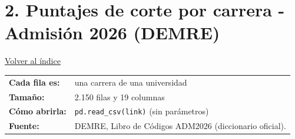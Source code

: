 \documentclass[10.5pt]{article}
\begin{document}
\section*{2. Puntajes de corte por carrera - Admisión 2026 (DEMRE)}
\vspace{-6pt}\hfill{\small\hyperlink{indice}{\textcolor{azuloscuro}{\underline{Volver al índice}}}}\par\vspace{2pt}
\begin{tabularx}{\linewidth}{@{}l X@{}}\textbf{Cada fila es:} & una carrera de una universidad \\\textbf{Tamaño:} & 2.150 filas y 19 columnas \\\textbf{Cómo abrirla:} & \texttt{pd.read\_\allowbreak{}csv(link)} (sin parámetros) \\\textbf{Fuente:} & DEMRE, Libro de Códigos ADM2026 (diccionario oficial). \\\end{tabularx}
\vspace{6pt}
\end{document}
